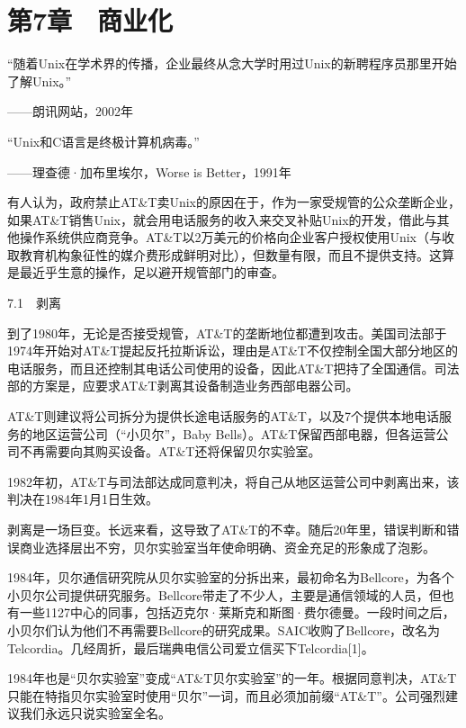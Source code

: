 \documentclass[a4paper,12pt,UTF8,twoside]{ctexbook}
\begin{document}
\chapter{第7章　商业化}


“随着Unix在学术界的传播，企业最终从念大学时用过Unix的新聘程序员那里开始了解Unix。”

——朗讯网站，2002年

“Unix和C语言是终极计算机病毒。”

——理查德·加布里埃尔，Worse is Better，1991年

有人认为，政府禁止AT\&T卖Unix的原因在于，作为一家受规管的公众垄断企业，如果AT\&T销售Unix，就会用电话服务的收入来交叉补贴Unix的开发，借此与其他操作系统供应商竞争。AT\&T以2万美元的价格向企业客户授权使用Unix（与收取教育机构象征性的媒介费形成鲜明对比），但数量有限，而且不提供支持。这算是最近乎生意的操作，足以避开规管部门的审查。





7.1　剥离


到了1980年，无论是否接受规管，AT\&T的垄断地位都遭到攻击。美国司法部于1974年开始对AT\&T提起反托拉斯诉讼，理由是AT\&T不仅控制全国大部分地区的电话服务，而且还控制其电话公司使用的设备，因此AT\&T把持了全国通信。司法部的方案是，应要求AT\&T剥离其设备制造业务西部电器公司。

AT\&T则建议将公司拆分为提供长途电话服务的AT\&T，以及7个提供本地电话服务的地区运营公司（“小贝尔”，Baby Bells）。AT\&T保留西部电器，但各运营公司不再需要向其购买设备。AT\&T还将保留贝尔实验室。

1982年初，AT\&T与司法部达成同意判决，将自己从地区运营公司中剥离出来，该判决在1984年1月1日生效。

剥离是一场巨变。长远来看，这导致了AT\&T的不幸。随后20年里，错误判断和错误商业选择层出不穷，贝尔实验室当年使命明确、资金充足的形象成了泡影。

1984年，贝尔通信研究院从贝尔实验室的分拆出来，最初命名为Bellcore，为各个小贝尔公司提供研究服务。Bellcore带走了不少人，主要是通信领域的人员，但也有一些1127中心的同事，包括迈克尔·莱斯克和斯图·费尔德曼。一段时间之后，小贝尔们认为他们不再需要Bellcore的研究成果。SAIC收购了Bellcore，改名为Telcordia。几经周折，最后瑞典电信公司爱立信买下Telcordia[1]。

1984年也是“贝尔实验室”变成“AT\&T贝尔实验室”的一年。根据同意判决，AT\&T只能在特指贝尔实验室时使用“贝尔”一词，而且必须加前缀“AT\&T”。公司强烈建议我们永远只说实验室全名。
\end{document}
